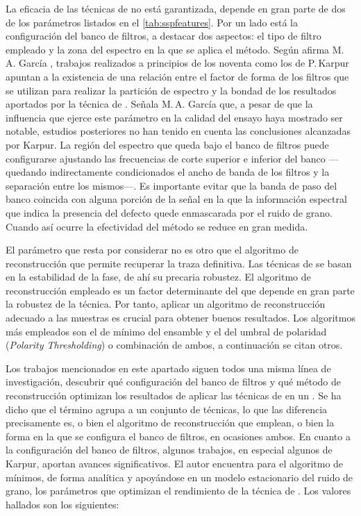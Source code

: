 La eficacia de las técnicas de  no está garantizada, depende en
gran parte de dos de los parámetros listados en el \cref{tab:sspfeatures}.
Por un lado está la configuración del banco de filtros, a destacar dos
aspectos: el tipo de filtro empleado y la zona del espectro en la que se
aplica el método. Según afirma M.\,A. García
\citep[en][]{garcia2000mrsr}, trabajos realizados a principios de los
noventa como los de P.\,Karpur apuntan a la existencia de una relación
entre el factor de forma de los filtros que se utilizan para realizar la
partición de espectro y la bondad de los resultados aportados por la
técnica de . Señala M.\,A. García que, a pesar de que la
influencia que ejerce este parámetro en la calidad del ensayo haya mostrado
ser notable, estudios posteriores no han tenido en cuenta las conclusiones
alcanzadas por Karpur. La región del espectro que queda bajo el banco de
filtros puede configurarse ajustando las frecuencias de corte superior e
inferior del banco ---quedando indirectamente condicionados el ancho de
banda de los filtros y la separación entre los mismos---. Es importante
evitar que la banda de paso del banco coincida con alguna porción de la
señal en la que la información espectral que indica la presencia del
defecto quede enmascarada por el ruido de grano. Cuando así ocurre la
efectividad del método se reduce en gran medida.

El parámetro que resta por considerar no es otro que el algoritmo de
reconstrucción que permite recuperar la traza definitiva. Las técnicas de
 se basan en la estabilidad de la fase, de ahí su precaria
robustez. El algoritmo de reconstrucción empleado es un factor determinante
del que depende en gran parte la robustez de la técnica. Por tanto, aplicar
un algoritmo de reconstrucción adecuado a las muestras es crucial para
obtener buenos resultados. Los algoritmos más empleados son el de mínimo
del ensamble y el del umbral de polaridad (\emph{Polarity Thresholding}) o
combinación de ambos, a continuación se citan otros.

Los trabajos mencionados en este apartado siguen todos una misma línea de
investigación, descubrir qué configuración del banco de filtros y qué
método de reconstrucción optimizan los resultados de aplicar las técnicas
de  en un . Se ha dicho que el término  agrupa
a un conjunto de técnicas, lo que las diferencia precisamente es, o bien el
algoritmo de reconstrucción que emplean, o bien la forma en la que se
configura el banco de filtros, en ocasiones ambos. En cuanto a la
configuración del banco de filtros, algunos trabajos, en especial algunos
de Karpur, aportan avances significativos. El autor encuentra para el
algoritmo de mínimos, de forma analítica y apoyándose en un modelo
estacionario del ruido de grano, los parámetros que optimizan el
rendimiento de la técnica de . Los valores hallados son los
siguientes:

